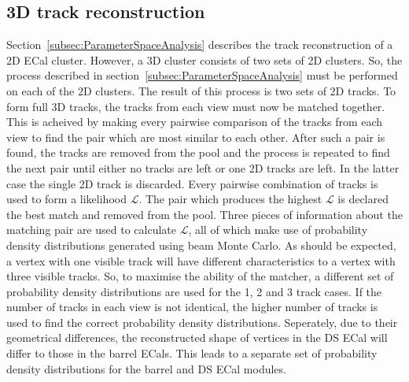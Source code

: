 \subsection{3D track reconstruction}
\label{subsec:3DHoughTrackReconstruction}
Section~\ref{subsec:ParameterSpaceAnalysis} describes the track reconstruction of a 2D ECal cluster.  However, a 3D cluster consists of two sets of 2D clusters.  So, the process described in section~\ref{subsec:ParameterSpaceAnalysis} must be performed on each of the 2D clusters.  The result of this process is two sets of 2D tracks.  To form full 3D tracks, the tracks from each view must now be matched together.  This is acheived by making every pairwise comparison of the tracks from each view to find the pair which are most similar to each other.  After such a pair is found, the tracks are removed from the pool and the process is repeated to find the next pair until either no tracks are left or one 2D tracks are left.  In the latter case the single 2D track is discarded. Every pairwise combination of tracks is used to form a likelihood $\mathcal{L}$.  The pair which produces the highest $\mathcal{L}$ is declared the best match and removed from the pool.  Three pieces of information about the matching pair are used to calculate $\mathcal{L}$, all of which make use of probability density distributions generated using beam Monte Carlo.  
\newline
As should be expected, a vertex with one visible track will have different characteristics to a vertex with three visible tracks.  So, to maximise the ability of the matcher, a different set of probability density distributions are used for the 1, 2 and 3 track cases.  If the number of tracks in each view is not identical, the higher number of tracks is used to find the correct probability density distributions.  Seperately, due to their geometrical differences, the reconstructed shape of vertices in the DS ECal will differ to those in the barrel ECals.  This leads to a separate set of probability density distributions for the barrel and DS ECal modules.
\newline
